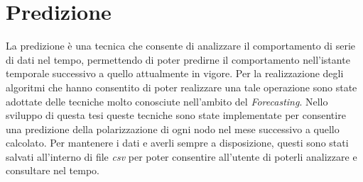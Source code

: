 \section{Predizione}
\label{Predizione}
La predizione è una tecnica che consente di analizzare il comportamento di serie di dati nel tempo, permettendo di poter predirne il comportamento nell'istante temporale successivo a quello attualmente in vigore.
Per la realizzazione degli algoritmi che hanno consentito di poter realizzare una tale operazione sono state adottate delle tecniche molto conosciute nell'ambito del \textit{Forecasting}.
Nello sviluppo di questa tesi queste tecniche sono state implementate per consentire una predizione della polarizzazione di ogni nodo nel mese successivo a quello calcolato. Per mantenere i dati e averli sempre a disposizione, questi sono stati salvati all'interno di file \textit{csv} per poter consentire all'utente di poterli analizzare e consultare nel tempo.
